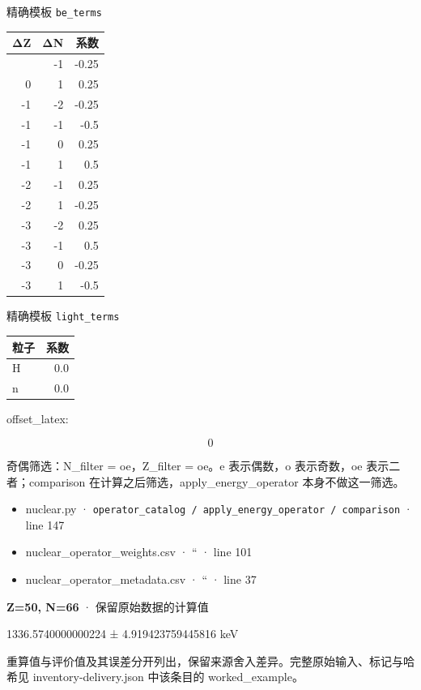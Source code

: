 \documentclass[
  11pt,
  letterpaper,
]{article}
\providecommand{\tightlist}{%
  \setlength{\itemsep}{0pt}\setlength{\parskip}{0pt}}
\begin{document}
精确模板 \texttt{be\_terms}

\begin{longtable}[]{@{}rrr@{}}
\toprule\noalign{}
ΔZ & ΔN & 系数 \\
\midrule\noalign{}
\endhead
\bottomrule\noalign{}
\endlastfoot
0 & -1 & -0.25 \\
0 & 1 & 0.25 \\
-1 & -2 & -0.25 \\
-1 & -1 & -0.5 \\
-1 & 0 & 0.25 \\
-1 & 1 & 0.5 \\
-2 & -1 & 0.25 \\
-2 & 1 & -0.25 \\
-3 & -2 & 0.25 \\
-3 & -1 & 0.5 \\
-3 & 0 & -0.25 \\
-3 & 1 & -0.5 \\
\end{longtable}

精确模板 \texttt{light\_terms}

\begin{longtable}[]{@{}lr@{}}
\toprule\noalign{}
粒子 & 系数 \\
\midrule\noalign{}
\endhead
\bottomrule\noalign{}
\endlastfoot
H & 0.0 \\
n & 0.0 \\
\end{longtable}

offset\_latex:

\[
0
\]

奇偶筛选：N\_filter = oe，Z\_filter = oe。e 表示偶数，o 表示奇数，oe
表示二者；comparison 在计算之后筛选，apply\_energy\_operator
本身不做这一筛选。

\begin{itemize}
\tightlist
\item
  nuclear.py ·
  \texttt{operator\_catalog\ /\ apply\_energy\_operator\ /\ comparison}
  · line 147
\item
  nuclear\_operator\_weights.csv · `` · line 101
\item
  nuclear\_operator\_metadata.csv · `` · line 37
\end{itemize}

\textbf{Z=50, N=66} · 保留原始数据的计算值

1336.5740000000224 ± 4.919423759445816 keV

重算值与评价值及其误差分开列出，保留来源舍入差异。完整原始输入、标记与哈希见
inventory-delivery.json 中该条目的 worked\_example。
\end{document}
